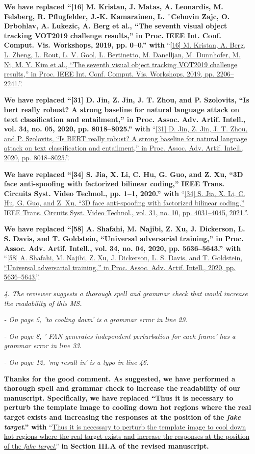 \documentclass[12pt]{article}
\begin{document}
\textbf{We have replaced ``[16] M. Kristan, J. Matas, A. Leonardis, M. Felsberg, R. Pflugfelder, J.-K. Kamarainen, L. ˇCehovin Zajc, O. Drbohlav, A. Lukezic, A. Berg et al., “The seventh visual object tracking VOT2019 challenge results,” in Proc. IEEE Int. Conf. Comput. Vis. Workshops, 2019, pp. 0–0.'' with} ``\uline{[16] M. Kristan, A. Berg, L. Zheng, L. Rout, L. V. Gool, L. Bertinetto, M. Danelljan, M. Dunnhofer, M. Ni, M. Y. Kim et al., “The seventh visual object tracking VOT2019 challenge results,” in Proc. IEEE Int. Conf. Comput. Vis. Workshops, 2019, pp. 2206–2241.}''.

\textbf{We have replaced ``[31] D. Jin, Z. Jin, J. T. Zhou, and P. Szolovits, “Is bert really robust? A strong baseline for natural language attack on text classification and entailment,” in Proc. Assoc. Adv. Artif. Intell., vol. 34, no. 05, 2020, pp. 8018–8025.'' with} ``\uline{[31] D. Jin, Z. Jin, J. T. Zhou, and P. Szolovits, “Is BERT really robust? A strong baseline for natural language attack on text classification and entailment,” in Proc. Assoc. Adv. Artif. Intell., 2020, pp. 8018–8025.}''.

\textbf{We have replaced ``[34] S. Jia, X. Li, C. Hu, G. Guo, and Z. Xu, “3D face anti-spoofing with factorized bilinear coding,” IEEE Trans. Circuits Syst. Video Technol., pp. 1–1, 2020.'' with} ``\uline{[34] S. Jia, X. Li, C. Hu, G. Guo, and Z. Xu, “3D face anti-spoofing with factorized bilinear coding,” IEEE Trans. Circuits Syst. Video Technol., vol. 31, no. 10, pp. 4031–4045, 2021.}''.

\textbf{We have replaced ``[58] A. Shafahi, M. Najibi, Z. Xu, J. Dickerson, L. S. Davis, and T. Goldstein, “Universal adversarial training,” in Proc. Assoc. Adv. Artif. Intell., vol. 34, no. 04, 2020, pp. 5636–5643.'' with} ``\uline{[58] A. Shafahi, M. Najibi, Z. Xu, J. Dickerson, L. S. Davis, and T. Goldstein, “Universal adversarial training,” in Proc. Assoc. Adv. Artif. Intell., 2020, pp. 5636–5643.}''.

\textit{4. The reviewer suggests a thorough spell and grammar check that would increase the readability of this MS.}

\textit{- On page 5, 'to cooling down' is a grammar error in line 29.}

\textit{- On page 8, ' FAN generates independent perturbation for each frame' has a grammar error in line 33.}

\textit{- On page 12, 'my result in' is a typo in line 46.}

\textbf{Thanks for the good comment. As suggested, we have performed a thorough spell and grammar check to increase the readability of our manuscript. Specifically, we have replaced ``Thus it is necessary to perturb the template image to cooling down hot regions where the real target exists and increasing the responses at the position of the \textit{fake target}.'' with} ``\uline{Thus it is necessary to perturb the template image to cool down hot regions where the real target exists and increase the responses at the position of the \textit{fake target}.}''
\textbf{in Section III.A of the revised manuscript.}
\end{document}
